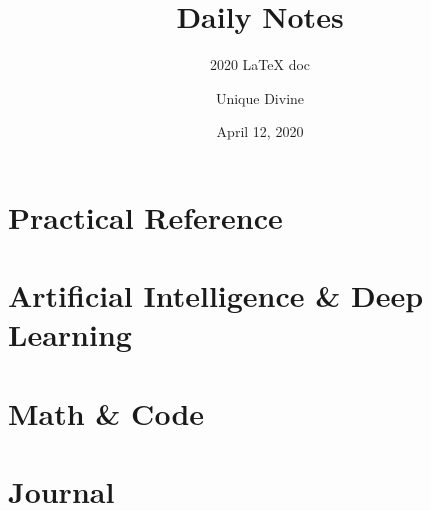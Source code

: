 \documentclass[11pt, fancy, bibstyle=apalike, cite=authoryear]{elegantbook}
\title{Daily Notes}
\subtitle{2020 \LaTeX{} doc}
\author{Unique Divine}
\institute{Elegant\LaTeX{} Program}
\date{April 12, 2020}
\begin{document}
\maketitle
\frontmatter
\tableofcontents



\mainmatter



\part{Practical Reference}


\part{Artificial Intelligence \& Deep Learning}


\part{Math \& Code}







\part{Journal}




\end{document}

